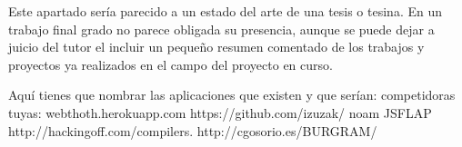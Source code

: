 
Este apartado sería parecido a un estado del arte de una tesis o tesina. En un trabajo final grado no parece obligada su presencia, aunque se puede dejar a juicio del tutor el incluir un pequeño resumen comentado de los trabajos y proyectos ya realizados en el campo del proyecto en curso. 



Aquí tienes que nombrar las aplicaciones que existen y que serían: competidoras tuyas:
webthoth.herokuapp.com
https://github.com/izuzak/
noam
JSFLAP
http://hackingoff.com/compilers.
http://cgosorio.es/BURGRAM/